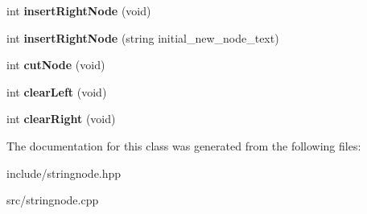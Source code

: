 \begin{DoxyCompactItemize}
\item 
int {\bfseries insert\+Right\+Node} (void)\hypertarget{classStringNode_acdd9f10faab37dd69762ab3774d50775}{}\label{classStringNode_acdd9f10faab37dd69762ab3774d50775}

\item 
int {\bfseries insert\+Right\+Node} (string initial\+\_\+new\+\_\+node\+\_\+text)\hypertarget{classStringNode_abf313da2479d5c40c2769474948a7398}{}\label{classStringNode_abf313da2479d5c40c2769474948a7398}

\item 
int {\bfseries cut\+Node} (void)\hypertarget{classStringNode_acd57ad0e36258a8fada5b092083218f0}{}\label{classStringNode_acd57ad0e36258a8fada5b092083218f0}

\item 
int {\bfseries clear\+Left} (void)\hypertarget{classStringNode_a8b39a65ddafb6a3324823da77d0af6d0}{}\label{classStringNode_a8b39a65ddafb6a3324823da77d0af6d0}

\item 
int {\bfseries clear\+Right} (void)\hypertarget{classStringNode_a778c4554c12fc329fd9d3ecb54c1849b}{}\label{classStringNode_a778c4554c12fc329fd9d3ecb54c1849b}

\end{DoxyCompactItemize}


The documentation for this class was generated from the following files\+:\begin{DoxyCompactItemize}
\item 
include/stringnode.\+hpp\item 
src/stringnode.\+cpp\end{DoxyCompactItemize}
